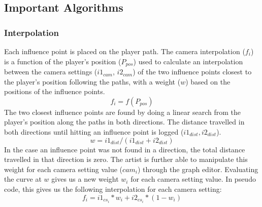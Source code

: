 \subsection{Important Algorithms}
\subsubsection{Interpolation}

Each influence point is placed on the player path. The camera interpolation ($f_{i}$) is a function of the player's position ($P_{pos}$) used to calculate an interpolation between the camera settings ($i1_{cam}$, $i2_{cam}$) of the two influence points closest to the player's position following the paths, with a weight ($w$) based on the positions of the influence points.
\begin{equation}
f_{i} = f(P_{pos})
\end{equation}
The two closest influence points are found by doing a linear search from the player's position along the paths in both directions. The distance travelled in both directions until hitting an influence point is logged ($i1_{dist}, i2_{dist}$).
\begin{equation}
w = i1_{dist}/(i1_{dist} + i2_{dist})
\end{equation}
In the case an influence point was not found in a direction, the total distance travelled in that direction is zero. The artist is further able to manipulate this weight for each camera setting value ($cam_{i}$) through the graph editor. Evaluating the curve at $w$ gives us a new weight $w_{i}$ for each camera setting value. In pseudo code, this gives us the following interpolation for each camera setting:
\begin{equation}
f_{i} = i1_{cs_{i}} * w_{i} + i2_{cs_{i}} * (1-w_{i})
\end{equation}
